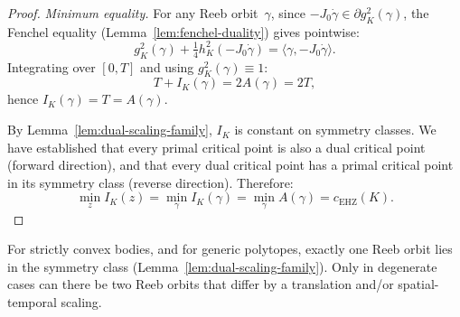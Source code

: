 \begin{proof}
\medskip
\emph{Minimum equality.}
For any Reeb orbit~$\gamma$, since $-J_0\dot{\gamma} \in \partial g_K^2(\gamma)$,
the Fenchel equality (Lemma~\ref{lem:fenchel-duality}) gives pointwise:
\[
  g_K^2(\gamma) + \tfrac{1}{4}h_K^2(-J_0\dot{\gamma})
  = \langle \gamma, -J_0\dot{\gamma} \rangle.
\]
Integrating over $[0,T]$ and using $g_K^2(\gamma) \equiv 1$:
\[
  T + I_K(\gamma) = 2A(\gamma) = 2T,
\]
hence $I_K(\gamma) = T = A(\gamma)$.

By Lemma~\ref{lem:dual-scaling-family}, $I_K$ is constant on symmetry classes.
We have established that every primal critical point is also a dual critical point (forward direction),
and that every dual critical point has a primal critical point in its symmetry class (reverse direction).
Therefore:
\[
  \min_z I_K(z) = \min_\gamma I_K(\gamma) = \min_\gamma A(\gamma) = c_{\mathrm{EHZ}}(K).
\]
\end{proof}

\begin{remark}\label{rem:symmetry-class-uniqueness}
For strictly convex bodies, and for generic polytopes, exactly one Reeb orbit
lies in the symmetry class (Lemma~\ref{lem:dual-scaling-family}).
Only in degenerate cases can there be two Reeb orbits that differ by a
translation and/or spatial-temporal scaling.
\end{remark}


